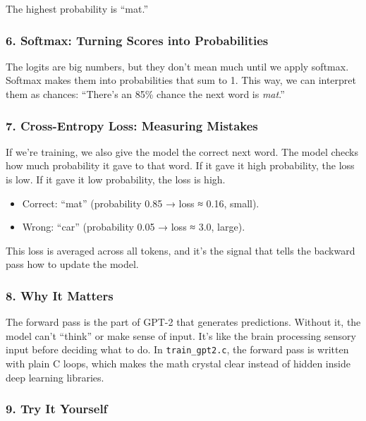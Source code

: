 \documentclass[
  letterpaper,
  DIV=11,
  numbers=noendperiod]{scrreprt}
\providecommand{\tightlist}{%
  \setlength{\itemsep}{0pt}\setlength{\parskip}{0pt}}
\begin{document}
The highest probability is ``mat.''

\subsubsection{6. Softmax: Turning Scores into
Probabilities}\label{softmax-turning-scores-into-probabilities}

The logits are big numbers, but they don't mean much until we apply
softmax. Softmax makes them into probabilities that sum to 1. This way,
we can interpret them as chances: ``There's an 85\% chance the next word
is \emph{mat}.''

\subsubsection{7. Cross-Entropy Loss: Measuring
Mistakes}\label{cross-entropy-loss-measuring-mistakes}

If we're training, we also give the model the correct next word. The
model checks how much probability it gave to that word. If it gave it
high probability, the loss is low. If it gave it low probability, the
loss is high.

\begin{itemize}
\tightlist
\item
  Correct: ``mat'' (probability 0.85 → loss ≈ 0.16, small).
\item
  Wrong: ``car'' (probability 0.05 → loss ≈ 3.0, large).
\end{itemize}

This loss is averaged across all tokens, and it's the signal that tells
the backward pass how to update the model.

\subsubsection{8. Why It Matters}\label{why-it-matters-18}

The forward pass is the part of GPT-2 that generates predictions.
Without it, the model can't ``think'' or make sense of input. It's like
the brain processing sensory input before deciding what to do. In
\texttt{train\_gpt2.c}, the forward pass is written with plain C loops,
which makes the math crystal clear instead of hidden inside deep
learning libraries.

\subsubsection{9. Try It Yourself}\label{try-it-yourself-20}
\end{document}
